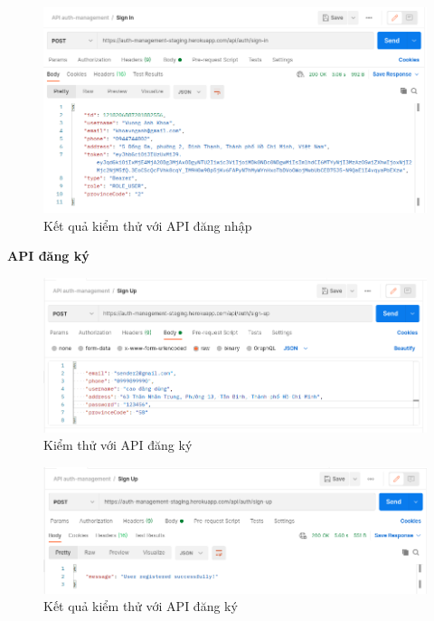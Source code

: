		\begin{figure}[H]
			\includegraphics[width=1\textwidth]{Images/testing/API-sign-in-result.png}
			\centering
			\linebreak
			\caption{Kết quả kiểm thử với API đăng nhập}
		\end{figure}
		\newpage
		\textbf{API đăng ký}
		
		\begin{figure}[H]
			\includegraphics[width=1\textwidth]{Images/testing/API-sign-up.png}
			\centering
			\linebreak
			\caption{Kiểm thử với API đăng ký}
		\end{figure}
		
		\begin{figure}[H]
			\includegraphics[width=1\textwidth]{Images/testing/API-sign-up-result.png}
			\centering
			\linebreak
			\caption{Kết quả kiểm thử với API đăng ký}
		\end{figure}

